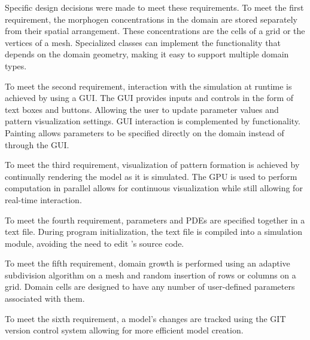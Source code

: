 Specific design decisions were made to meet these requirements. To meet the first requirement, the morphogen concentrations in the domain are stored separately from their spatial arrangement. These concentrations are the cells of a grid or the vertices of a mesh. Specialized classes can implement the functionality that depends on the domain geometry, making it easy to support multiple domain types.

To meet the second requirement, interaction with the simulation at runtime is achieved by using a GUI. The GUI provides inputs and controls in the form of text boxes and buttons. Allowing the user to update parameter values and pattern visualization settings. GUI interaction is complemented by  functionality. Painting allows parameters to be specified directly on the domain instead of through the GUI.

To meet the third requirement, visualization of pattern formation is achieved by continually rendering the model as it is simulated. The GPU is used to perform computation in parallel allows for continuous visualization while still allowing for real-time interaction.

To meet the fourth requirement, parameters and PDEs are specified together in a text file. During program initialization, the text file is compiled into a simulation module, avoiding the need to edit \ProgramName{}'s source code.

To meet the fifth requirement, domain growth is performed using an adaptive subdivision algorithm on a mesh and random insertion of rows or columns on a grid. Domain cells are designed to have any number of user-defined parameters associated with them. 

To meet the sixth requirement, a model's changes are tracked using the GIT version control system allowing for more efficient model creation.

